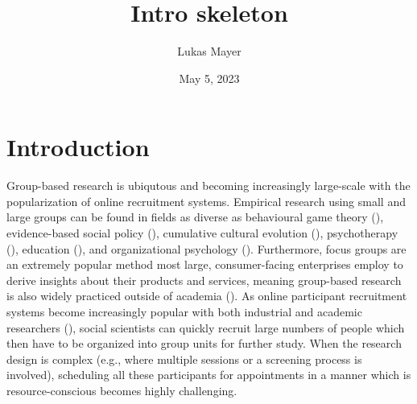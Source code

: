 \documentclass{article}
\title{Intro skeleton}
\date{May 5, 2023}
\author{Lukas Mayer}
\begin{document}
  \maketitle
  \section*{Introduction}
  
  \par
  Group-based research is ubiqutous and
  becoming increasingly large-scale with the popularization of 
  online recruitment systems. 
  Empirical research using small and large groups can  be found in fields as diverse as 
  behavioural game theory (\cite{hawkinsConductingRealtimeMultiplayer2015}),
  evidence-based social policy (\cite{balafoutasAffirmativeActionPolicies2012, janssenLabExperimentsStudy2010, hauserCooperatingFuture2014, nishiInequalityVisibilityWealth2015}),
  cumulative cultural evolution (\cite{derexExperimentalEvidenceInfluence2013}),
  psychotherapy (\cite{rebokTenYearEffectsAdvanced2014, joyceInterpersonalPredictorsOutcome2010}),
  education (\cite{osbornePupilsViewsRole2001, yeagerNationalExperimentReveals2019}),
  and organizational psychology (\cite{spoonTeamEffectivenessCreative2021}). 
  Furthermore, focus groups are an extremely popular method most large, consumer-facing
  enterprises employ to derive insights about their products and services,
  meaning group-based research is also widely practiced outside of academia (\cite{kruegerFocusGroupsPractical2014}).
  As online participant recruitment systems become increasingly popular with
  both industrial and academic researchers (\cite{sauterBuildingHostingRecruiting2020}), social scientists can quickly recruit 
  large numbers of people which then have to be organized into group units for further study. 
  When the research design is complex 
  (e.g., where multiple sessions or a screening process is involved), 
  scheduling all these participants for
  appointments in a manner which is resource-conscious becomes highly challenging. 
  
\end{document}
